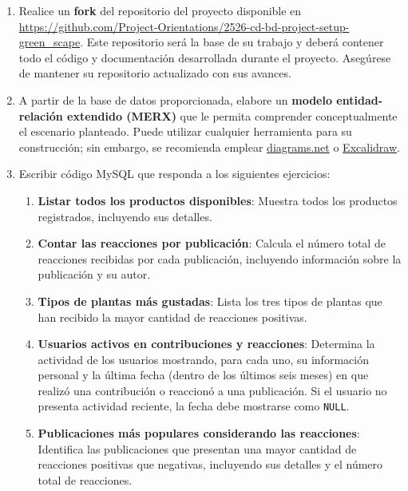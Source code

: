 \documentclass[10pt]{article}
\begin{document}
	\begin{enumerate}
		\item Realice un \textbf{fork} del repositorio del proyecto disponible en \url{https://github.com/Project-Orientations/2526-cd-bd-project-setup-green_scape}. Este repositorio será la base de su trabajo y deberá contener todo el código y documentación desarrollada durante el proyecto. Asegúrese de mantener su repositorio actualizado con sus avances.
		
		\item A partir de la base de datos proporcionada, elabore un \textbf{modelo entidad-relación extendido (MERX)} que le permita comprender conceptualmente el escenario planteado. 
		Puede utilizar cualquier herramienta para su construcción; sin embargo, se recomienda emplear 
		\href{https://app.diagrams.net/?src=about}{diagrams.net} o 
		\href{https://excalidraw.com/}{Excalidraw}.
		
		\item Escribir código MySQL que responda a los siguientes ejercicios:
		
		\begin{enumerate}
			\item \textbf{Listar todos los productos disponibles}: Muestra todos los productos registrados, incluyendo sus detalles.
			
			\item \textbf{Contar las reacciones por publicación}: Calcula el número total de reacciones recibidas por cada publicación, incluyendo información sobre la publicación y su autor.
			
			\item \textbf{Tipos de plantas más gustadas}: Lista los tres tipos de plantas que han recibido la mayor cantidad de reacciones positivas.
			
			\item \textbf{Usuarios activos en contribuciones y reacciones}: Determina la actividad de los usuarios mostrando, para cada uno, su información personal y la última fecha (dentro de los últimos seis meses) en que realizó una contribución o reaccionó a una publicación. Si el usuario no presenta actividad reciente, la fecha debe mostrarse como \texttt{NULL}.
			
			\item \textbf{Publicaciones más populares considerando las reacciones}: Identifica las publicaciones que presentan una mayor cantidad de reacciones positivas que negativas, incluyendo sus detalles y el número total de reacciones.
			

\end{enumerate}
\end{enumerate}
\end{document}
